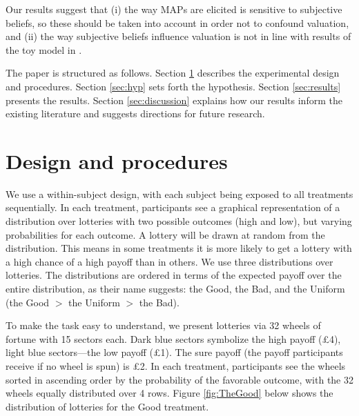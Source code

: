 
Our results suggest that (i) the way MAPs are elicited is sensitive to subjective beliefs, so these should be taken into account in order not to confound valuation, and (ii) the way subjective beliefs influence valuation is not in line with results of the toy model in \cite{Li2020a}.


The paper is structured as follows.
Section \ref{sec:proced} describes the experimental design and procedures.
Section \ref{sec:hyp} sets forth the hypothesis.
Section \ref{sec:results} presents the results.
Section \ref{sec:discussion} explains how our results inform the existing literature and suggests directions for future research.


\section{Design and procedures}\label{sec:proced}
We use a within-subject design, with each subject being exposed to all treatments sequentially.
In each treatment, participants see a graphical representation of a distribution over lotteries with two possible outcomes (high and low), but varying probabilities for each outcome.
A lottery will be drawn at random from the distribution.
This means in some treatments it is more likely to get a lottery with a high chance of a high payoff than in others.
We use three distributions over lotteries.
The distributions are ordered in terms of the expected payoff over the entire distribution, as their name suggests: the Good, the Bad, and the Uniform (the Good $>$ the Uniform $>$ the Bad).

To make the task easy to understand, we present lotteries via 32 wheels of fortune with 15 sectors each.
Dark blue sectors symbolize the high payoff (\pounds4), light blue sectors---the low payoff (\pounds1).
The sure payoff (the payoff participants receive if no wheel is spun) is \pounds2.
In each treatment, participants see the wheels sorted in ascending order by the probability of the favorable outcome, with the 32 wheels equally distributed over 4 rows.
Figure \ref{fig:TheGood} below shows the distribution of lotteries for the Good treatment.

